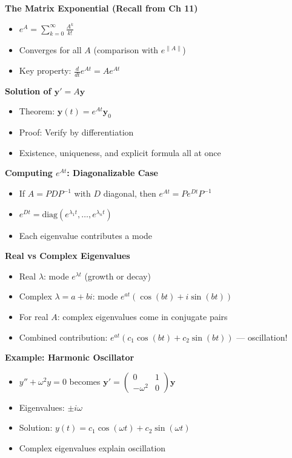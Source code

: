 \documentclass[
  10pt,
  letterpaper,
]{scrbook}
\providecommand{\tightlist}{%
  \setlength{\itemsep}{0pt}\setlength{\parskip}{0pt}}
\begin{document}
\textbf{The Matrix Exponential (Recall from Ch 11)}

\begin{itemize}
\tightlist
\item
  \(e^{A} = \sum_{k=0}^\infty \frac{A^k}{k!}\)
\item
  Converges for all \(A\) (comparison with \(e^{\|A\|}\))
\item
  Key property: \(\frac{d}{dt} e^{At} = A e^{At}\)
\end{itemize}

\textbf{Solution of \(\mathbf{y}' = A\mathbf{y}\)}

\begin{itemize}
\tightlist
\item
  Theorem: \(\mathbf{y}(t) = e^{At}\mathbf{y}_0\)
\item
  Proof: Verify by differentiation
\item
  Existence, uniqueness, and explicit formula all at once
\end{itemize}

\textbf{Computing \(e^{At}\): Diagonalizable Case}

\begin{itemize}
\tightlist
\item
  If \(A = PDP^{-1}\) with \(D\) diagonal, then
  \(e^{At} = P e^{Dt} P^{-1}\)
\item
  \(e^{Dt} = \text{diag}(e^{\lambda_1 t}, \ldots, e^{\lambda_n t})\)
\item
  Each eigenvalue contributes a mode
\end{itemize}

\textbf{Real vs Complex Eigenvalues}

\begin{itemize}
\tightlist
\item
  Real \(\lambda\): mode \(e^{\lambda t}\) (growth or decay)
\item
  Complex \(\lambda = a + bi\): mode \(e^{at}(\cos(bt) + i\sin(bt))\)
\item
  For real \(A\): complex eigenvalues come in conjugate pairs
\item
  Combined contribution: \(e^{at}(c_1\cos(bt) + c_2\sin(bt))\) ---
  oscillation!
\end{itemize}

\textbf{Example: Harmonic Oscillator}

\begin{itemize}
\tightlist
\item
  \(y'' + \omega^2 y = 0\) becomes
  \(\mathbf{y}' = \begin{pmatrix} 0 & 1 \\ -\omega^2 & 0 \end{pmatrix} \mathbf{y}\)
\item
  Eigenvalues: \(\pm i\omega\)
\item
  Solution: \(y(t) = c_1 \cos(\omega t) + c_2 \sin(\omega t)\)
\item
  Complex eigenvalues explain oscillation
\end{itemize}
\end{document}
